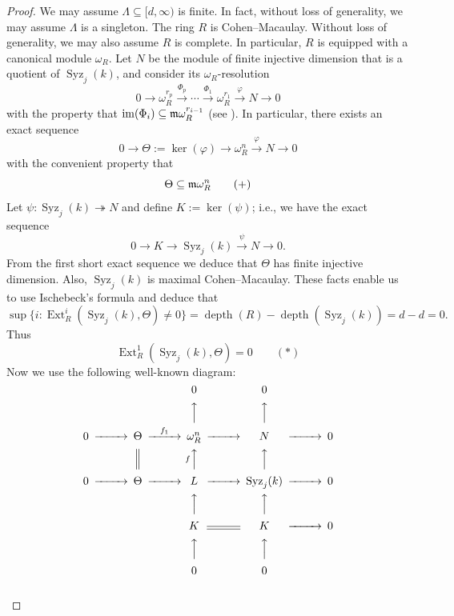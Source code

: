 \documentclass[10. pt,a4paper]{amsart}
\theoremstyle{definition}
\theoremstyle{remark}
\newcommand{\Ext}{\operatorname{Ext}}
\newcommand{\depth}{\operatorname{depth}}
\newcommand{\fm}{\frak{m}}
\begin{document}
\begin{proof}We may assume $\Lambda \subseteq [d, \infty)$ is finite.
In fact, without loss of generality, we may assume $\Lambda$ is a singleton. The ring $R$ is Cohen--Macaulay. Without loss of generality, we may also assume $R$ is complete. In particular, $R$ is equipped with a canonical module $\omega_R$. Let $N$ be the module of finite injective dimension that is a quotient of $\operatorname{Syz}_j(k)$, and consider its $\omega_R$-resolution
	\[
	0 \longrightarrow \omega_R^{r_p} \stackrel{\Phi_p}{\longrightarrow} \cdots \stackrel{\Phi_1}{\longrightarrow} \omega_R^{r_1} \stackrel{\varphi}{\longrightarrow} N \longrightarrow 0
	\]
	with the property that $\operatorname{im}(\Phi_i) \subseteq \fm \omega_R^{r_{i-1}}$ (see \cite[3.3.28(c)]{BH}). In particular, there exists an exact sequence
	\[
	0 \to \Theta := \ker(\varphi) \to \omega_R^n \stackrel{\varphi}{\longrightarrow} N \to 0
	\]
	with the convenient property that
	\[
	\Theta \subseteq \fm \omega_R^n \qquad (+)
	\]
	Let $\psi : \operatorname{Syz}_j(k) \twoheadrightarrow N$ and define $K := \ker(\psi)$; i.e., we have the exact sequence
	\[
	0 \to K \to \operatorname{Syz}_j(k) \stackrel{\psi}{\longrightarrow} N \to 0.
	\]
	From the first short exact sequence we deduce that $\Theta$ has finite injective dimension. Also, $\operatorname{Syz}_j(k)$ is maximal Cohen--Macaulay. These facts enable us to use Ischebeck's formula and deduce that
	\[
	\sup\{i : \Ext^i_R(\operatorname{Syz}_j(k), \Theta) \neq 0\} = \depth(R) - \depth(\operatorname{Syz}_j(k)) = d - d = 0.
	\]
	Thus
	\[
	\Ext^1_R(\operatorname{Syz}_j(k), \Theta) = 0 \qquad (\ast)
	\]
	Now we use the following well-known diagram:
	\[
	\begin{CD}
	@. @. 0 @. 0 \\
	@. @. @AAA @AAA \\
	0 @>>> \Theta @>f_1>> \omega_R^n @>>> N @>>> 0 \\
	@. @| @AfAA @AAA \\
	0 @>>> \Theta @>>> L @>>> \operatorname{Syz}_j(k) @>>> 0 \\
	@. @. @AAA @AAA \\
	@. @. K @= K @>>> 0 \\
	@. @. @AAA @AAA \\
	@. @. 0 @. 0
	\end{CD}
	\]
	\\
	

\end{proof}
\end{document}
